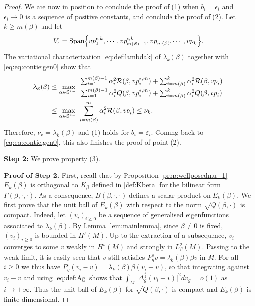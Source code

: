 \documentclass[10pt,a4paper]{amsart}
\def\ep{{\varepsilon}}
\newcommand{\vp}{{\rm vp}}
\begin{document}
\begin{proof}
We are now in position to conclude the proof of (1) when $b_i = \epsilon_i$ and  $\epsilon_i \to 0$ is a sequence of positive constants, and conclude the proof of (2).  Let $k \ge m(\beta)$ and let
$$V_{\epsilon}  = \text{Span} \Big \{ \vp_1^{\epsilon,k},\cdots,\vp_{m(\beta)-1}^{\epsilon,k},\vp_{m(\beta)},\cdots, \vp_{k} \Big \}. $$
The variational characterization \eqref{eq:def:lambdak} of $\lambda_k(\beta)$ together with \eqref{eq:eq:contieigen0} show that 
\begin{equation} \label{eq:contieigen2} \begin{aligned}
\lambda_k(\beta) & \leq \max_{\alpha \in \mathbb{S}^{k-1}} \frac{\sum_{i=1}^{m(\beta)-1}\alpha_i^2 \mathcal{R}(\beta,  \vp_i^{\epsilon,m})+  \sum_{i=m(\beta)}^k \alpha_i^2 \mathcal{R}(\beta,  \vp_i)}{\sum_{i=1}^{m(\beta)-1}\alpha_i^2 Q(\beta,  \vp_i^{\epsilon,m})+  \sum_{i=m(\beta)}^k \alpha_i^2 Q(\beta,  \vp_i)} \\
& \le  \max_{\alpha \in \mathbb{S}^{k-1}}  \sum_{i=m(\beta)}^m \alpha_i^2 \mathcal{R}(\beta,  \vp_i) \leq \nu_k.
\end{aligned} 
\end{equation}
Therefore, $\nu_k = \lambda_k(\beta)$ and (1) holds for $b_i = \ep_i$. Coming back to \eqref{eq:eq:contieigen0}, this also finishes the proof of point (2). 


\medskip

\textbf{Step 2:} We prove property (3).

\medskip


\textbf{Proof of Step 2:} First, recall that by Proposition \ref{prop:wellposedmu_1} $E_k(\beta)$ is orthogonal to $K_{\beta}$ defined in \eqref{def:Kbeta} for the bilinear form $\Gamma(\beta, \cdot, \cdot)$. As a consequence, $B(\beta, \cdot, \cdot)$ defines a scalar product on $E_k(\beta)$. We first prove that the unit ball of $E_k(\beta)$ with respect to the norm $\sqrt{Q(\beta,\cdot)}$ is compact. Indeed, let $(v_i)_{i \ge0}$ be a sequence of generalised eigenfunctions associated to $\lambda_k(\beta)$. By Lemma \ref{lem:mainlemma}, since $\beta \neq 0$ is fixed, $(v_i)_{i \ge0}$ is bounded in $H^s(M)$. Up to the extraction of a subsequence, $v_i$ converges to some $v$ weakly in $H^s(M)$ and strongly in $L^2_{\beta}(M)$. Passing to the weak limit, it is easily seen that $v$ still satisfies $P_g^s v = \lambda_k(\beta) \beta v$ in $M$. For all $i \ge 0$ we thus have $P_g^s(v_i - v) = \lambda_k(\beta) \beta (v_i-v)$, so that integrating against $v_i-v$ and using \eqref{eq:def:Ag} shows that $ \int_M \big|\Delta_g^{\frac{s}{2}} (v_i-v) \big|^2 dv_g = o(1)$  as $i \to + \infty$. Thus the unit ball of  $E_k(\beta)$ for $\sqrt{Q(\beta,\cdot)}$ is compact and $E_k(\beta)$ is finite dimensional. 


\end{proof}
\end{document}
